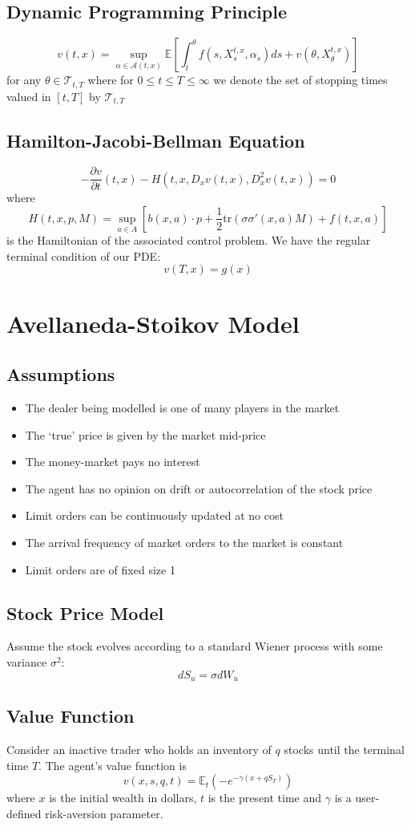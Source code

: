 \documentclass{article}
\begin{document}
\subsection{Dynamic Programming Principle}
$$v(t,x)=\sup\limits_{\alpha\in\mathcal{A}(t,x)}\mathbb{E}\left[\int_t^\theta f(s,X_s^{t,x},\alpha_s)ds+v(\theta,X_\theta^{t,x})\right]$$
for any $\theta\in\mathcal{T}_{t,T}$ where for $0\leq t\leq T\leq\infty$ we denote the set of stopping times valued in $[t,T]$ by $\mathcal{T}_{t,T}$
\subsection{Hamilton-Jacobi-Bellman Equation}
$$-\frac{\partial v}{\partial t}(t,x)-H(t,x,D_xv(t,x),D^2_xv(t,x))=0$$
where
$$H(t,x,p,M)=\sup\limits_{a\in A}\left[b(x,a)\cdot p+\frac{1}{2}\textrm{tr}(\sigma\sigma'(x,a)M)+f(t,x,a)\right]$$
is the Hamiltonian of the associated control problem. We have the regular terminal condition of our PDE:
$$v(T,x)=g(x)$$
\newpage
\section{Avellaneda-Stoikov Model}
\subsection{Assumptions}
\begin{itemize}
    \item The dealer being modelled is one of many players in the market
    \item The `true' price is given by the market mid-price
    \item The money-market pays no interest
    \item The agent has no opinion on drift or autocorrelation of the stock price
    \item Limit orders can be continuously updated at no cost
    \item The arrival frequency of market orders to the market is constant
    \item Limit orders are of fixed size 1
\end{itemize}
\subsection{Stock Price Model}
Assume the stock evolves according to a standard Wiener process with some variance $\sigma^2$: 
$$dS_u=\sigma dW_u$$
\subsection{Value Function}
Consider an inactive trader who holds an inventory of $q$ stocks until the terminal time $T.$ The agent's value function is
$$v(x,s,q,t)=\mathbb{E}_t\left(-e^{-\gamma(x+qS_T)}\right)$$
where $x$ is the initial wealth in dollars, $t$ is the present time and $\gamma$ is a user-defined risk-aversion parameter.
\end{document}

